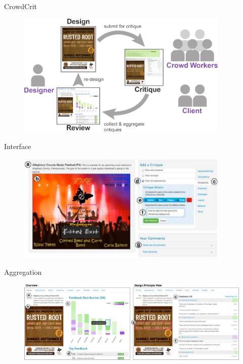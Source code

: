 	\begin{frame}{CrowdCrit}
		\begin{figure}
			\centering
			\includegraphics[width=0.9\textwidth]{images/CrowdCrit-overview}
		\end{figure}	
	\end{frame}

	\begin{frame}{Interface}
		\begin{figure}
			\centering
			\includegraphics[width=0.9\textwidth]{images/CrowdCrit-critUI}
		\end{figure}
	\end{frame}


	\begin{frame}{Aggregation}
		\begin{figure}
			\centering
			\includegraphics[width=\textwidth]{images/CrowdCrit-aggregation}
		\end{figure}
	\end{frame}

